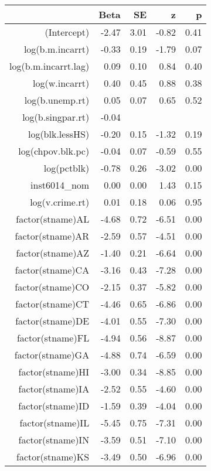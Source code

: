 \begin{table}[ht]
\centering
\begin{tabular}{rrrrr}
  \hline
 & Beta & SE & z & p \\ 
  \hline
(Intercept) & -2.47 & 3.01 & -0.82 & 0.41 \\ 
  log(b.m.incarrt) & -0.33 & 0.19 & -1.79 & 0.07 \\ 
  log(b.m.incarrt.lag) & 0.09 & 0.10 & 0.84 & 0.40 \\ 
  log(w.incarrt) & 0.40 & 0.45 & 0.88 & 0.38 \\ 
  log(b.unemp.rt) & 0.05 & 0.07 & 0.65 & 0.52 \\ 
  log(b.singpar.rt) & -0.04 &  &  &  \\ 
  log(blk.lessHS) & -0.20 & 0.15 & -1.32 & 0.19 \\ 
  log(chpov.blk.pc) & -0.04 & 0.07 & -0.59 & 0.55 \\ 
  log(pctblk) & -0.78 & 0.26 & -3.02 & 0.00 \\ 
  inst6014\_nom & 0.00 & 0.00 & 1.43 & 0.15 \\ 
  log(v.crime.rt) & 0.01 & 0.18 & 0.06 & 0.95 \\ 
  factor(stname)AL & -4.68 & 0.72 & -6.51 & 0.00 \\ 
  factor(stname)AR & -2.59 & 0.57 & -4.51 & 0.00 \\ 
  factor(stname)AZ & -1.40 & 0.21 & -6.64 & 0.00 \\ 
  factor(stname)CA & -3.16 & 0.43 & -7.28 & 0.00 \\ 
  factor(stname)CO & -2.15 & 0.37 & -5.82 & 0.00 \\ 
  factor(stname)CT & -4.46 & 0.65 & -6.86 & 0.00 \\ 
  factor(stname)DE & -4.01 & 0.55 & -7.30 & 0.00 \\ 
  factor(stname)FL & -4.94 & 0.56 & -8.87 & 0.00 \\ 
  factor(stname)GA & -4.88 & 0.74 & -6.59 & 0.00 \\ 
  factor(stname)HI & -3.00 & 0.34 & -8.85 & 0.00 \\ 
  factor(stname)IA & -2.52 & 0.55 & -4.60 & 0.00 \\ 
  factor(stname)ID & -1.59 & 0.39 & -4.04 & 0.00 \\ 
  factor(stname)IL & -5.45 & 0.75 & -7.31 & 0.00 \\ 
  factor(stname)IN & -3.59 & 0.51 & -7.10 & 0.00 \\ 
  factor(stname)KS & -3.49 & 0.50 & -6.96 & 0.00 \\ 

\end{tabular}
\end{table}

